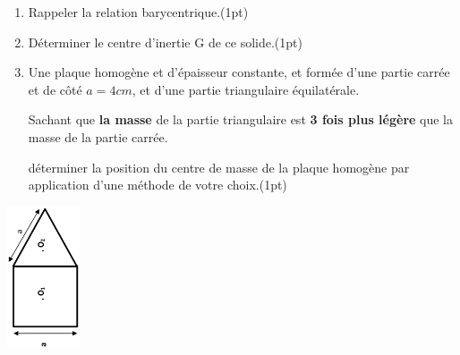 \documentclass[12pt]{article}
\begin{document}
\begin{enumerate}

\item Rappeler la relation barycentrique.\dotfill(1pt)
\item Déterminer le centre d’inertie G de ce solide.\dotfill(1pt)
\item Une plaque homogène et d’épaisseur constante, et formée d’une partie carrée et de côté $a=4cm$, et d’une partie triangulaire équilatérale.

	Sachant que \textbf{la masse} de la partie triangulaire est \textbf{3 fois plus légère} que la masse de la partie carrée.

	déterminer la position du centre de masse de la plaque homogène par application d’une méthode de votre choix.\dotfill(1pt)
\end{enumerate}

 \begin{center}
	\includegraphics[width=0.16\textwidth]{./img/ex4.png}
\end{center}
\end{document}
